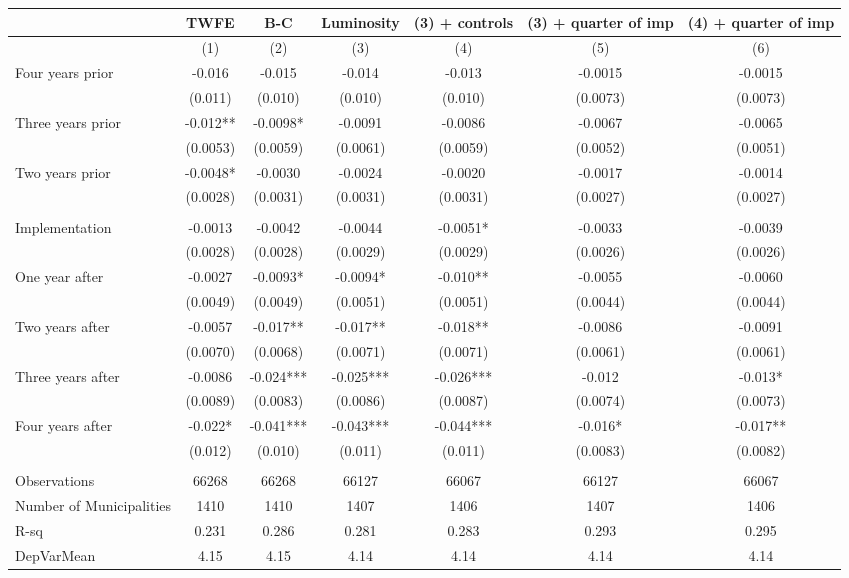 \begin{tabular}{lcccccc}
\toprule
      & TWFE  & B-C   & Luminosity & (3) + controls & (3) + quarter of imp & (4) + quarter of imp \\
\midrule
      & (1)   & (2)   & (3)   & (4)   & (5)   & (6) \\
\midrule
\midrule
Four years prior & -0.016 & -0.015 & -0.014 & -0.013 & -0.0015 & -0.0015 \\
      & (0.011) & (0.010) & (0.010) & (0.010) & (0.0073) & (0.0073) \\
Three years prior & -0.012** & -0.0098* & -0.0091 & -0.0086 & -0.0067 & -0.0065 \\
      & (0.0053) & (0.0059) & (0.0061) & (0.0059) & (0.0052) & (0.0051) \\
Two years prior & -0.0048* & -0.0030 & -0.0024 & -0.0020 & -0.0017 & -0.0014 \\
      & (0.0028) & (0.0031) & (0.0031) & (0.0031) & (0.0027) & (0.0027) \\
      &       &       &       &       &       &  \\
Implementation & -0.0013 & -0.0042 & -0.0044 & -0.0051* & -0.0033 & -0.0039 \\
      & (0.0028) & (0.0028) & (0.0029) & (0.0029) & (0.0026) & (0.0026) \\
One year after & -0.0027 & -0.0093* & -0.0094* & -0.010** & -0.0055 & -0.0060 \\
      & (0.0049) & (0.0049) & (0.0051) & (0.0051) & (0.0044) & (0.0044) \\
Two years after & -0.0057 & -0.017** & -0.017** & -0.018** & -0.0086 & -0.0091 \\
      & (0.0070) & (0.0068) & (0.0071) & (0.0071) & (0.0061) & (0.0061) \\
Three years after & -0.0086 & -0.024*** & -0.025*** & -0.026*** & -0.012 & -0.013* \\
      & (0.0089) & (0.0083) & (0.0086) & (0.0087) & (0.0074) & (0.0073) \\
Four years after & -0.022* & -0.041*** & -0.043*** & -0.044*** & -0.016* & -0.017** \\
      & (0.012) & (0.010) & (0.011) & (0.011) & (0.0083) & (0.0082) \\
      &       &       &       &       &       &  \\
\midrule
Observations & 66268 & 66268 & 66127 & 66067 & 66127 & 66067 \\
Number of Municipalities & 1410  & 1410  & 1407  & 1406  & 1407  & 1406 \\
R-sq  & 0.231 & 0.286 & 0.281 & 0.283 & 0.293 & 0.295 \\
DepVarMean & 4.15  & 4.15  & 4.14  & 4.14  & 4.14  & 4.14 \\
\bottomrule
\bottomrule
\end{tabular}%
